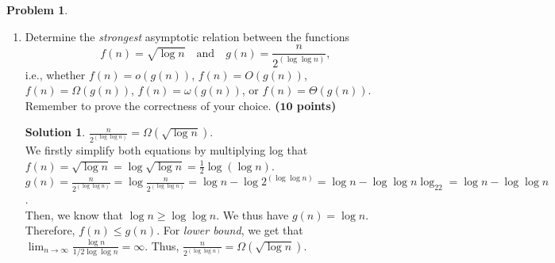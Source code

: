 \documentclass{article}
\theoremstyle{definition}
\newtheorem{problem}{Problem}
\newtheorem*{solution*}{Solution}
\newenvironment{solution}{\begin{solution*}}{{} \end{solution*}}
\newcommand{\grade}[1]{\hfill{\textbf{($\mathbf{#1}$ points)}}}
\begin{document}
\begin{problem}\label{basics}~
\begin{enumerate}[label=(\alph*)]
	\item Determine the \emph{strongest} asymptotic relation between the functions 
	\[
	f(n) = \sqrt{\log{n}} \quad \text{and} \quad g(n) = \frac{n}{2^{(\log\log{n})}},
	\]
	i.e., whether $f(n) = o(g(n))$, $f(n) = O(g(n))$, $f(n) = \Omega(g(n))$, $f(n) = \omega(g(n))$, or $f(n) = \Theta(g(n))$. 
	Remember to prove the correctness of your choice. \grade{10}

\bigskip
\begin{solution}
	
	$\frac{n}{2^{(\log\log{n})}} = \Omega( \sqrt{\log{n}})$. \\
	
	We firstly simplify both equations by multiplying log that $f(n) = \sqrt{\log{n}} = \log{\sqrt{\log{n}}} = \frac{1}{2}\log(\log{n})$. \\
	
	$g(n) = \frac{n}{2^{(\log\log{n})}} = \log{\frac{n}{2^{(\log\log{n})}}}= \log{n} - \log{2^{(\log\log{n})}} = \log{n} - \log\log{n}\log_22 = \log{n} - \log\log{n}$. \\
	
	Then, we know that  $\log{n} \geq \log\log{n}$. We thus have $g(n) = \log{n}$. \\
	
	Therefore, $f(n) \leq g(n)$. For 	\emph{lower bound}, we get that $\lim_{n \to \infty}\frac{\log{n}}{1/2\log\log{n}} = \infty$. Thus, $\frac{n}{2^{(\log\log{n})}} = \Omega( \sqrt{\log{n}})$. \\
	
\end{solution}


\end{enumerate}
\end{problem}
\end{document}
